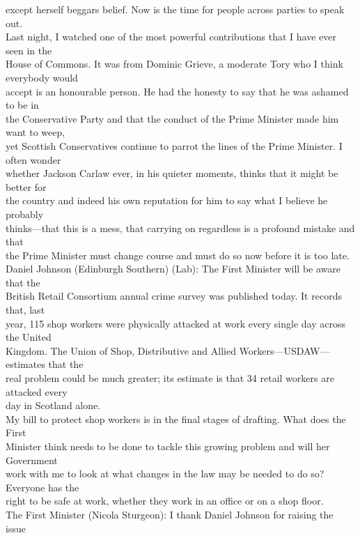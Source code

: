 \documentclass{article}
\begin{document}
\begin{description}
{except herself beggars belief. Now is the time for people across parties to speak out.\\
Last night, I watched one of the most powerful contributions that I have ever seen in the\\
House of Commons. It was from Dominic Grieve, a moderate Tory who I think everybody would\\
accept is an honourable person. He had the honesty to say that he was ashamed to be in\\
the Conservative Party and that the conduct of the Prime Minister made him want to weep,\\
yet Scottish Conservatives continue to parrot the lines of the Prime Minister. I often wonder\\
whether Jackson Carlaw ever, in his quieter moments, thinks that it might be better for\\
the country and indeed his own reputation for him to say what I believe he probably\\
thinks—that this is a mess, that carrying on regardless is a profound mistake and that\\
the Prime Minister must change course and must do so now before it is too late.\\
Daniel Johnson (Edinburgh Southern) (Lab): The First Minister will be aware that the\\
British Retail Consortium annual crime survey was published today. It records that, last\\
year, 115 shop workers were physically attacked at work every single day across the United\\
Kingdom. The Union of Shop, Distributive and Allied Workers—USDAW—estimates that the\\
real problem could be much greater; its estimate is that 34 retail workers are attacked every\\
day in Scotland alone.\\
My bill to protect shop workers is in the final stages of drafting. What does the First\\
Minister think needs to be done to tackle this growing problem and will her Government\\
work with me to look at what changes in the law may be needed to do so? Everyone has the\\
right to be safe at work, whether they work in an office or on a shop floor.\\
The First Minister (Nicola Sturgeon): I thank Daniel Johnson for raising the issue\\
}
\end{description}
\end{document}

